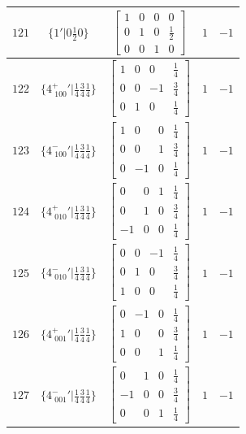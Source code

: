 \documentclass[fleqn,8pt]{jsarticle}
\begin{document}
\begin{longtable}{ccccc}
$ 121 $ & $ \{1{}'|0 \frac{1}{2} 0\} $ & $ \begin{bmatrix} 1 & 0 & 0 & 0 \\ 0 & 1 & 0 & \frac{1}{2} \\ 0 & 0 & 1 & 0 \end{bmatrix} $ & $ 1 $ & $ -1 $ \\ \hline
$ 122 $ & $ \{4^{+}_{\,\,100}{}'|\frac{1}{4} \frac{3}{4} \frac{1}{4}\} $ & $ \begin{bmatrix} 1 & 0 & 0 & \frac{1}{4} \\ 0 & 0 & -1 & \frac{3}{4} \\ 0 & 1 & 0 & \frac{1}{4} \end{bmatrix} $ & $ 1 $ & $ -1 $ \\ \hline
$ 123 $ & $ \{4^{-}_{\,\,100}{}'|\frac{1}{4} \frac{3}{4} \frac{1}{4}\} $ & $ \begin{bmatrix} 1 & 0 & 0 & \frac{1}{4} \\ 0 & 0 & 1 & \frac{3}{4} \\ 0 & -1 & 0 & \frac{1}{4} \end{bmatrix} $ & $ 1 $ & $ -1 $ \\ \hline
$ 124 $ & $ \{4^{+}_{\,\,010}{}'|\frac{1}{4} \frac{3}{4} \frac{1}{4}\} $ & $ \begin{bmatrix} 0 & 0 & 1 & \frac{1}{4} \\ 0 & 1 & 0 & \frac{3}{4} \\ -1 & 0 & 0 & \frac{1}{4} \end{bmatrix} $ & $ 1 $ & $ -1 $ \\ \hline
$ 125 $ & $ \{4^{-}_{\,\,010}{}'|\frac{1}{4} \frac{3}{4} \frac{1}{4}\} $ & $ \begin{bmatrix} 0 & 0 & -1 & \frac{1}{4} \\ 0 & 1 & 0 & \frac{3}{4} \\ 1 & 0 & 0 & \frac{1}{4} \end{bmatrix} $ & $ 1 $ & $ -1 $ \\ \hline
$ 126 $ & $ \{4^{+}_{\,\,001}{}'|\frac{1}{4} \frac{3}{4} \frac{1}{4}\} $ & $ \begin{bmatrix} 0 & -1 & 0 & \frac{1}{4} \\ 1 & 0 & 0 & \frac{3}{4} \\ 0 & 0 & 1 & \frac{1}{4} \end{bmatrix} $ & $ 1 $ & $ -1 $ \\ \hline
$ 127 $ & $ \{4^{-}_{\,\,001}{}'|\frac{1}{4} \frac{3}{4} \frac{1}{4}\} $ & $ \begin{bmatrix} 0 & 1 & 0 & \frac{1}{4} \\ -1 & 0 & 0 & \frac{3}{4} \\ 0 & 0 & 1 & \frac{1}{4} \end{bmatrix} $ & $ 1 $ & $ -1 $ \\ \hline

\end{longtable}
\end{document}
